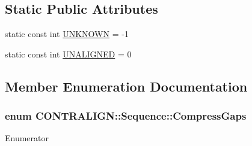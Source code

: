 \subsection*{Static Public Attributes}
\begin{DoxyCompactItemize}
\item 
static const int \hyperlink{class_c_o_n_t_r_a_l_i_g_n_1_1_sequence_a6b77aa13d532d0e59d90e82a59100755}{U\+N\+K\+N\+O\+W\+N} = -\/1
\item 
static const int \hyperlink{class_c_o_n_t_r_a_l_i_g_n_1_1_sequence_a774a2f48e7469edbb81641e5abf26ccd}{U\+N\+A\+L\+I\+G\+N\+E\+D} = 0
\end{DoxyCompactItemize}


\subsection{Member Enumeration Documentation}
\hypertarget{class_c_o_n_t_r_a_l_i_g_n_1_1_sequence_ad5c978f10d584ae0e8460033964162c3}{
\subsubsection[{Compress\+Gaps}]{\setlength{\rightskip}{0pt plus 5cm}enum {\bf C\+O\+N\+T\+R\+A\+L\+I\+G\+N\+::\+Sequence\+::\+Compress\+Gaps}}}\label{class_c_o_n_t_r_a_l_i_g_n_1_1_sequence_ad5c978f10d584ae0e8460033964162c3}
\begin{Desc}
\item[Enumerator]\par
\begin{description}
\item[{\em 
\hypertarget{class_c_o_n_t_r_a_l_i_g_n_1_1_sequence_ad5c978f10d584ae0e8460033964162c3af58075360dac5d2e0da7b362c977e9b7}{C\+O\+M\+P\+R\+E\+S\+S\+\_\+\+G\+A\+P\+S}\label{class_c_o_n_t_r_a_l_i_g_n_1_1_sequence_ad5c978f10d584ae0e8460033964162c3af58075360dac5d2e0da7b362c977e9b7}
}]\end{description}
\end{Desc}
